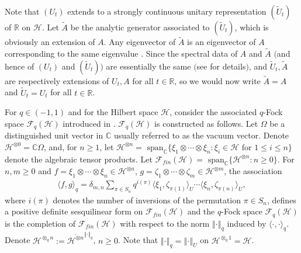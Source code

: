 \documentclass[12pt, a4paper,reqno]{amsart}
\theoremstyle{definition}
\renewcommand{\leq}{\leqslant}
\renewcommand{\geq}{\geqslant}
\def\C{\mathbb C}
\def\R{\mathbb R}
\newcommand{\CF}{\mathcal{F}}
\newcommand{\CH}{\mathcal{H}}
\newcommand{\norm}[1]{\left\Vert#1\right\Vert}
\begin{document}
Note that $(U_t)$ extends to a strongly continuous unitary representation $(\widetilde{U}_t)$ of $\R$ on $\CH$. Let $\widetilde{A}$ be the analytic generator associated to $(\widetilde{U}_t)$, which is obviously an extension of $A$. Any eigenvector of $\widetilde{A}$ is an eigenvector of $A$ corresponding to the same eigenvalue \cite[Prop. 2.1]{bik-kunal}. 
Since the spectral data of $A$ and $\widetilde{A}$ $($and hence of $(U_t)$ and $(\widetilde{U}_t))$ are essentially the same $($see \cite[\S2]{bik-kunal} for details$)$, and $\widetilde{U}_t,\widetilde{A}$ are respectively extensions of $U_t,A$ for all $t\in \R$, so we would now write $\widetilde{A}=A$ and $\widetilde{U}_t=U_t$ for all $t\in\R$. 

For $ q \in (-1, 1)$ and for the Hilbert space $\CH$, consider the associated 
$q$-Fock space $\CF_q(\CH)$ introduced in \cite{BS}. $\CF_q(\CH)$ is constructed as follows. Let $\Omega$ be a distinguished unit vector in $\C$ usually referred to as the vacuum vector. Denote $\CH^{\otimes 0}= \C\Omega$, and, for $n\geq 1$, let $\CH^{\otimes n} = \text{ span}_{\C}\{\xi_1 \otimes \cdots \otimes \xi_n : \xi_i \in \CH \text{ for }1\leq i\leq n\}$ denote the algebraic tensor products. Let $\CF_{fin}(\CH)=\text{ span}_{\C}\{\CH^{\otimes n}: n\geq 0 \}$. For $n,m\geq 0$ and $f=\xi_1 \otimes \cdots \otimes \xi_n \in \CH^{\otimes n}$, $g= \zeta_1\otimes \cdots \otimes \zeta_m\in \CH^{\otimes m}$, the association 
\begin{align}\label{qFock}
\langle f, g \rangle_q = \delta_{m, n} 
\sum_{ \pi \in S_n } q^{ i(\pi) } \langle \xi_1, \zeta_{\pi(1) }\rangle_U \cdots\langle \xi_n, \zeta_{\pi(n) } \rangle_U, 
\end{align} 
where $i(\pi)$ denotes the number of  inversions of the permutation $\pi \in S_n $, defines a positive definite sesquilinear form on  $ \CF_{fin}(\CH)$ and the $q$-Fock space $\CF_q(\CH) $ is the completion of $ \CF_{fin}(\CH)$ with respect to the norm $\norm{\cdot}_{q}$ induced by $ \langle \cdot, \cdot \rangle_q $. Denote $\CH^{\otimes_q n}:=
\overline{\CH^{\otimes n}}^{\norm{\cdot}_q}$, $n\geq 0$. Note that $\norm{\cdot}_{q}=\norm{\cdot}_{U}$ on $\CH^{\otimes_q 1}=\CH$. 
\end{document}
